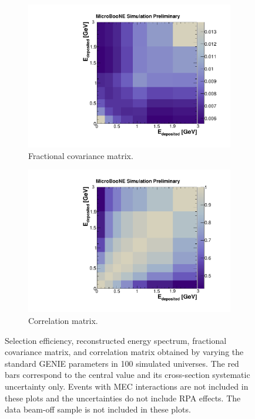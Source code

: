 \begin{figure}[htbp]
\begin{center}
\begin{subfigure}{0.49\textwidth}
      \includegraphics[width=\linewidth]{figures/frac_genie.pdf}
      \caption{Fractional covariance matrix.}\label{fig:frac_genie}
    \end{subfigure}\hfill
    \begin{subfigure}{0.49\textwidth}
      \includegraphics[width=\linewidth]{figures/corr_genie.pdf}
      \caption{Correlation matrix.}\label{fig:corr_genie}
    \end{subfigure}
    \caption{Selection efficiency, reconstructed energy spectrum, fractional covariance matrix, and correlation matrix obtained by varying the standard GENIE parameters in 100 simulated universes. The red bars correspond to the central value and its cross-section systematic uncertainty only. Events with MEC interactions are not included in these plots and the uncertainties do not include RPA effects. The data beam-off sample is not included in these plots.} \label{fig:genie_sys}
	\end{center}
\end{figure}


